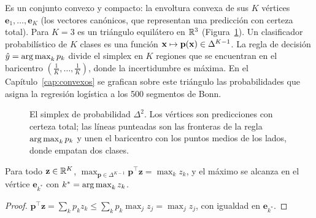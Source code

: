 Es un conjunto convexo y compacto: la envoltura convexa de sus $K$ vértices $\mathbf{e}_1,\dots,\mathbf{e}_K$
(los vectores canónicos, que representan una predicción con certeza total). Para $K = 3$ es un triángulo
equilátero en $\mathbb{R}^3$ (Figura~\ref{fig:simplex_teorico}). Un clasificador probabilístico de $K$ clases es una
función $\mathbf{x} \mapsto \mathbf{p}(\mathbf{x}) \in \Delta^{K-1}$. La regla de decisión $\hat y = \operatorname*{arg\,max}_k p_k$ divide el
simplex en $K$ regiones que se encuentran en el baricentro $(\frac1K,\dots,\frac1K)$, donde la incertidumbre
es máxima. En el Capítulo~\ref{cap:convexos} se grafican sobre este triángulo las probabilidades que asigna
la regresión logística a los 500 segmentos de Bonn.

\begin{figure}[ht]
\centering
{}
\caption{El simplex de probabilidad $\Delta^2$. Los vértices son predicciones con certeza total; las líneas
punteadas son las fronteras de la regla $\operatorname*{arg\,max}_k p_k$ y unen el baricentro con los puntos medios de los lados,
donde empatan dos clases.}
\label{fig:simplex_teorico}
\end{figure}

\begin{proposicion}
\label{prop:lineal_simplex}
Para todo $\mathbf{z} \in \mathbb{R}^K$, $\max_{\mathbf{p} \in \Delta^{K-1}} \mathbf{p}^\top\mathbf{z} = \max_k z_k$, y el máximo
se alcanza en el vértice $\mathbf{e}_{k^*}$ con $k^* = \operatorname*{arg\,max}_k z_k$.
\end{proposicion}
\begin{proof}
$\mathbf{p}^\top\mathbf{z} = \sum_k p_k z_k \le \sum_k p_k \max_j z_j = \max_j z_j$, con igualdad en $\mathbf{e}_{k^*}$.
\end{proof}

